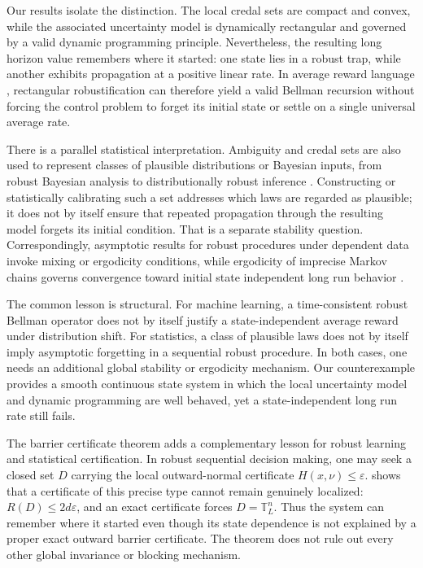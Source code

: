 \documentclass[11pt,reqno,noamsfonts]{amsart}
\theoremstyle{definition}
\theoremstyle{remark}
\newcommand{\T}{\mathbb T}
\begin{document}
Our results isolate the distinction. The local credal sets are compact
and convex, while the associated uncertainty model is dynamically
rectangular and governed by a valid dynamic programming principle.
Nevertheless, the resulting long horizon value remembers where it
started: one state lies in a robust trap, while another exhibits
propagation at a positive linear rate. In average reward language \cite[Chapters~8-9]{Puterman1994},
rectangular robustification can therefore yield a valid Bellman recursion
without forcing the control problem to forget its initial state or settle
on a single universal average rate.

There is a parallel statistical interpretation. Ambiguity and credal
sets are also used to represent classes of plausible distributions or
Bayesian inputs, from robust Bayesian analysis to distributionally robust
inference
\cite{BergerRiosInsuaRuggeri2000,DuchiGlynnNamkoong2021}.
Constructing or statistically calibrating such a set addresses which
laws are regarded as plausible; it does not by itself ensure that
repeated propagation through the resulting model forgets its initial
condition. That is a separate stability question. Correspondingly,
asymptotic results for robust procedures under dependent data invoke
mixing or ergodicity conditions, while ergodicity of imprecise Markov
chains governs convergence toward initial state independent long run
behavior
\cite{DeCoomanHermansQuaeghebeur2009,DuchiGlynnNamkoong2021,HermansDeCooman2012}.

The common lesson is structural. For machine learning, a time-consistent
robust Bellman operator does not by itself justify a state-independent
average reward under distribution shift. For statistics, a class of
plausible laws does not by itself imply asymptotic forgetting in a
sequential robust procedure. In both cases, one needs an additional
global stability or ergodicity mechanism. Our counterexample provides a
smooth continuous state system in which the local uncertainty model and
dynamic programming are well behaved, yet a state-independent long run
rate still fails.

The barrier certificate theorem adds a complementary lesson for robust
learning and statistical certification.  In robust sequential decision
making, one may seek a closed set $D$ carrying the local outward-normal
certificate
$H(x,\nu)\le\varepsilon$.   shows that a
certificate of this precise type cannot remain genuinely localized:
$R(D)\le2d\varepsilon$, and an exact certificate forces
$D=\T_L^n$.  Thus the system can remember where it started even though
its state dependence is not explained by a proper exact outward barrier
certificate.  The theorem does not rule out every other global
invariance or blocking mechanism.
\end{document}

